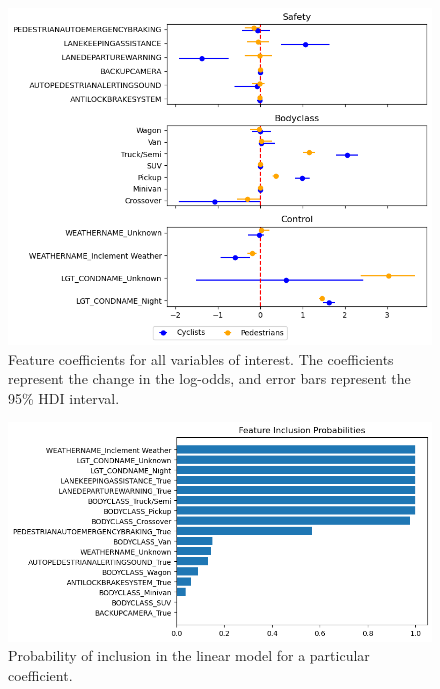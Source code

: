 \documentclass[12pt]{article}
\begin{document}
\begin{figure}[h]
    \centering
    \includegraphics[width=\textwidth]{images/feature_coefficients.png}
    \caption{Feature coefficients for all variables of interest. The coefficients represent the change in the log-odds,
        and error bars represent the 95\% HDI interval.}
    \label{fig:coefficients}
\end{figure}


\begin{figure}[h]
    \centering
    \includegraphics[width=\textwidth]{images/inclusion_probs.png}
    \caption{Probability of inclusion in the linear model for a particular coefficient.}
    \label{fig:inclusion_probs}
\end{figure}
\end{document}
